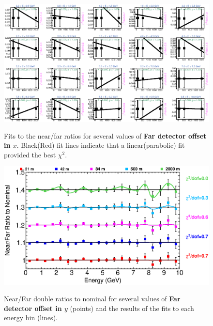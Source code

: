 {\begin{figure}[ht]
  \begin{center}
    {\includegraphics[width=5.0in]{figures/LBNEFDX_nof_fits.eps}}
  \end{center}
\caption{ Fits to the near/far ratios for several values of {\bf Far detector offset in $x$}. Black(Red) fit lines indicate that a linear(parabolic) fit provided the best $\chi^2$. }
\end{figure}

\begin{figure}[ht]
  \begin{center}
    {\includegraphics[width=6.0in]{figures/LBNEFDY_nof_summary.eps}}
  \end{center}
\caption{ Near/Far double ratios to nominal for several values of {\bf Far detector offset in $y$} (points) and the results of the fits to each energy bin (lines).}
\end{figure}

}
